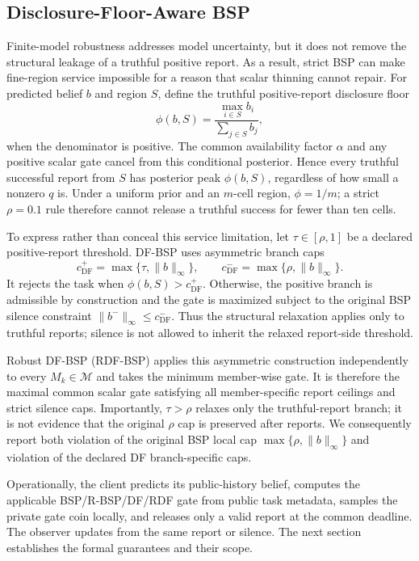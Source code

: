 \documentclass[10pt,journal,compsoc]{IEEEtran}
\begin{document}
\subsection{Disclosure-Floor-Aware BSP}
\label{sec:dfbsp}
Finite-model robustness addresses model uncertainty, but it does not remove the structural leakage of a truthful positive report. As a result, strict BSP can make fine-region service impossible for a reason that scalar thinning cannot repair. For predicted belief $b$ and region $S$, define the truthful positive-report disclosure floor
\begin{equation}
 \phi(b,S)=\frac{\max_{i\in S}b_i}{\sum_{j\in S}b_j},
 \label{eq:floor}
\end{equation}
when the denominator is positive. The common availability factor $\alpha$ and any positive scalar gate cancel from this conditional posterior. Hence every truthful successful report from $S$ has posterior peak $\phi(b,S)$, regardless of how small a nonzero $q$ is. Under a uniform prior and an $m$-cell region, $\phi=1/m$; a strict $\rho=0.1$ rule therefore cannot release a truthful success for fewer than ten cells.

To express rather than conceal this service limitation, let $\tau\in[\rho,1]$ be a declared positive-report threshold. DF-BSP uses asymmetric branch caps
\begin{equation}
 c^+_{\mathrm{DF}}=\max\{\tau,\|b\|_\infty\},
 \qquad
 c^-_{\mathrm{DF}}=\max\{\rho,\|b\|_\infty\}.
 \label{eq:dfcap}
\end{equation}
It rejects the task when $\phi(b,S)>c^+_{\mathrm{DF}}$. Otherwise, the positive branch is admissible by construction and the gate is maximized subject to the original BSP silence constraint $\|b^-\|_\infty\le c^-_{\mathrm{DF}}$. Thus the structural relaxation applies only to truthful reports; silence is not allowed to inherit the relaxed report-side threshold.

Robust DF-BSP (RDF-BSP) applies this asymmetric construction independently to every $M_k\in\mathcal M$ and takes the minimum member-wise gate. It is therefore the maximal common scalar gate satisfying all member-specific report ceilings and strict silence caps. Importantly, $\tau>\rho$ relaxes only the truthful-report branch; it is not evidence that the original $\rho$ cap is preserved after reports. We consequently report both violation of the original BSP local cap $\max\{\rho,\|b\|_\infty\}$ and violation of the declared DF branch-specific caps.

Operationally, the client predicts its public-history belief, computes the applicable BSP/R-BSP/DF/RDF gate from public task metadata, samples the private gate coin locally, and releases only a valid report at the common deadline. The observer updates from the same report or silence. The next section establishes the formal guarantees and their scope.
\end{document}
